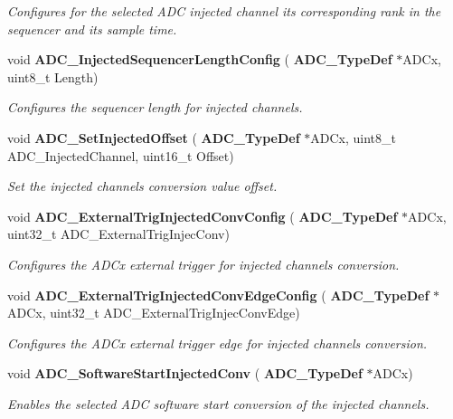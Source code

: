 \begin{DoxyCompactItemize}
\begin{DoxyCompactList}\small\item\em Configures for the selected A\+DC injected channel its corresponding rank in the sequencer and its sample time. \end{DoxyCompactList}\item 
void \textbf{ A\+D\+C\+\_\+\+Injected\+Sequencer\+Length\+Config} (\textbf{ A\+D\+C\+\_\+\+Type\+Def} $\ast$A\+D\+Cx, uint8\+\_\+t Length)
\begin{DoxyCompactList}\small\item\em Configures the sequencer length for injected channels. \end{DoxyCompactList}\item 
void \textbf{ A\+D\+C\+\_\+\+Set\+Injected\+Offset} (\textbf{ A\+D\+C\+\_\+\+Type\+Def} $\ast$A\+D\+Cx, uint8\+\_\+t A\+D\+C\+\_\+\+Injected\+Channel, uint16\+\_\+t Offset)
\begin{DoxyCompactList}\small\item\em Set the injected channels conversion value offset. \end{DoxyCompactList}\item 
void \textbf{ A\+D\+C\+\_\+\+External\+Trig\+Injected\+Conv\+Config} (\textbf{ A\+D\+C\+\_\+\+Type\+Def} $\ast$A\+D\+Cx, uint32\+\_\+t A\+D\+C\+\_\+\+External\+Trig\+Injec\+Conv)
\begin{DoxyCompactList}\small\item\em Configures the A\+D\+Cx external trigger for injected channels conversion. \end{DoxyCompactList}\item 
void \textbf{ A\+D\+C\+\_\+\+External\+Trig\+Injected\+Conv\+Edge\+Config} (\textbf{ A\+D\+C\+\_\+\+Type\+Def} $\ast$A\+D\+Cx, uint32\+\_\+t A\+D\+C\+\_\+\+External\+Trig\+Injec\+Conv\+Edge)
\begin{DoxyCompactList}\small\item\em Configures the A\+D\+Cx external trigger edge for injected channels conversion. \end{DoxyCompactList}\item 
void \textbf{ A\+D\+C\+\_\+\+Software\+Start\+Injected\+Conv} (\textbf{ A\+D\+C\+\_\+\+Type\+Def} $\ast$A\+D\+Cx)
\begin{DoxyCompactList}\small\item\em Enables the selected A\+DC software start conversion of the injected channels. \end{DoxyCompactList}\item 

\end{DoxyCompactItemize}
